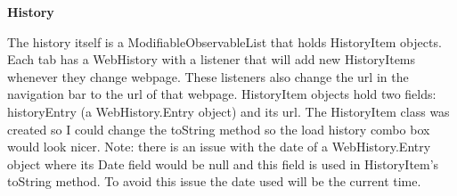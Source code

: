 \documentclass[10pt,a4paper]{report}
\begin{document}
	 
	 \LARGE \noindent \justifying \textbf{History} \par
	 \normalsize \noindent The history itself is a ModifiableObservableList that holds HistoryItem objects. Each tab has a WebHistory with a listener that will add new HistoryItems whenever they change webpage. These listeners also change the url in the navigation bar to the url of that webpage.
	 HistoryItem objects hold two fields: historyEntry (a WebHistory.Entry object) and its url. The HistoryItem class was created so I could change the toString method so the load history combo box would look nicer. Note: there is an issue with the date of a WebHistory.Entry object where its Date field would be null and this field is used in HistoryItem’s toString method. To avoid this issue the date used will be the current time. \par
\end{document}
